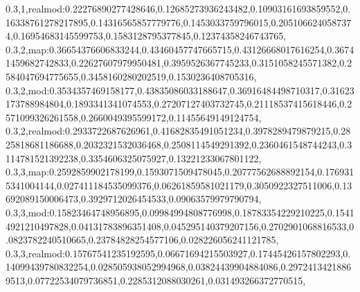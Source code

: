 0.3,1,realmod:0.22276890277428646,0.12685273936243482,0.10903161693859552,0.16338761278217895,0.14316565857779776,0.1453033759796015,0.2051066240587374,0.16954683145599753,0.1583128795377845,0.12374358246743765,
0.3,2,map:0.36654376606833244,0.43460457747665715,0.43126668017616254,0.36741459682742833,0.22627607979950481,0.3959526367745233,0.3151058245571382,0.2584047694775655,0.3458160280202519,0.1530236408705316,
0.3,2,mod:0.3534357469158177,0.43835086033188647,0.36916484498710317,0.31623173788984804,0.1893341341074553,0.27207127403732745,0.21118537415618446,0.2571099326261558,0.2660049395599172,0.11455649149124754,
0.3,2,realmod:0.2933722687626961,0.41682835491051234,0.3978289479879215,0.2825818681186688,0.2032321532036468,0.2508114549291392,0.2360461548744243,0.3114781521392238,0.3354606325075927,0.13221233067801122,
0.3,3,map:0.2592859902178199,0.1593071509478045,0.20777562688892154,0.1769315341004144,0.027411184535099376,0.06261859581021179,0.3050922327511006,0.13692089150006473,0.3929712026454533,0.09063579979790794,
0.3,3,mod:0.15823464748956895,0.09984994808776998,0.18783354229210225,0.15414921210497828,0.04131783896351408,0.045295140379207156,0.2702901068816533,0.0823782240510665,0.23784828254577106,0.028226056241121785,
0.3,3,realmod:0.15767541235192595,0.06671694215503927,0.17445426157802293,0.14099439780832254,0.028505938052994968,0.03824439904884086,0.29724134218869513,0.07722534079736851,0.2285312088030261,0.031493266372770515,
